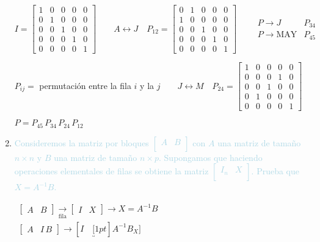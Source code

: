 \begin{enumerate}[label=\color{red}\textbf{\arabic*)},leftmargin=*]
	$I=\begin{bmatrix}
		1 & 0 & 0 & 0 & 0 \\
		0 & 1 & 0 & 0 & 0 \\
		0 & 0 & 1 & 0 & 0 \\
		0 & 0 & 0 & 1 & 0 \\
		0 & 0 & 0 & 0 & 1
	\end{bmatrix}\qquad A\longleftrightarrow J\quad P_{12}=\begin{bmatrix}
		0 & 1 & 0 & 0 & 0 \\
		1 & 0 & 0 & 0 & 0 \\
		0 & 0 & 1 & 0 & 0 \\
		0 & 0 & 0 & 1 & 0 \\
		0 & 0 & 0 & 0 & 1
	\end{bmatrix}\qquad\begin{array}{ll}
		P\longrightarrow J & P_{34}\\
		P\longrightarrow\mathrm{MAY} & P_{45}
	\end{array}$
	
	$P_{ij}=$ permutación entre la fila $i$ y la $j\qquad J\longleftrightarrow M\quad P_{24}=\begin{bmatrix}
		1 & 0 & 0 & 0 & 0 \\
		0 & 0 & 0 & 1 & 0 \\
		0 & 0 & 1 & 0 & 0 \\
		0 & 1 & 0 & 0 & 0 \\
		0 & 0 & 0 & 0 & 1
	\end{bmatrix}$ 
	
	$P=P_{45}\,P_{34}\,P_{24}\, P_{12}$
	
	\item \textcolor{lightblue}{Consideremos la matriz por bloques $\begin{bmatrix}
			A & B\\
		\end{bmatrix}$ con $A$ una matriz de tamaño $n\times n$ y $B$ una matriz de tamaño $n\times p$. Supongamos que haciendo operaciones elementales de filas se obtiene la matriz $\begin{bmatrix}
		I_n & X\\
		\end{bmatrix}$. Prueba que $X=A^{-1}B$.}
	
	$\begin{array}{l}
		\begin{bmatrix}
		A & B
	\end{bmatrix}\xrightarrow[\text{fila}]{}\begin{bmatrix}
	I & X
\end{bmatrix}\longrightarrow X=A^{-1}B\\
\begin{bmatrix}
	A & I\,B
\end{bmatrix}\longrightarrow[
I \quad \underbracket[1pt]{A^{-1}B}_{X}
]\\
	\end{array}$
	

\end{enumerate}
